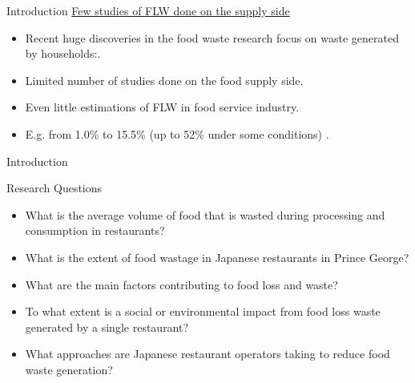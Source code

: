 \documentclass{beamer}\usepackage[]{graphicx}\usepackage[]{xcolor}
\begin{document}
\begin{frame}{Introduction}
    \underline{Few studies of FLW done on the supply side}
    \begin{itemize}
        \item Recent huge discoveries in the food waste research focus on waste generated by households:\cite{Aschemann-Witzel2015-xj,Lusk2017-xm,Nahman2012-ys,Von_Massow2019-qa}.
    \end{itemize}

    \begin{itemize}
        \item Limited number of studies done on the food supply side.
        \item Even little estimations of FLW in food service industry.
        \item E.g. from 1.0\% to 15.5\% (up to 52\% under some conditions) \cite{Ministry_of_Environment_And_Climate_Change_Strategy2018-sk}. 
    \end{itemize}
\end{frame}

\begin{frame}{Introduction}
    \begin{block}{Research Questions}
        \begin{itemize}
            \item What is the average volume of food that is wasted during processing and consumption in restaurants?
            \item What is the extent of food wastage in Japanese restaurants in Prince George?
            \item What are the main factors contributing to food loss and waste?
            \item To what extent is a social or environmental impact from food loss waste generated by a single restaurant?
            \item What approaches are Japanese restaurant operators taking to reduce food waste generation?
        \end{itemize}
    \end{block}
\end{frame}
\end{document}
